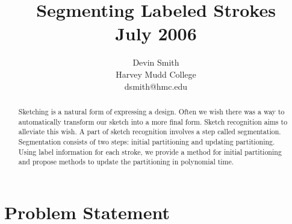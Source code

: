 \documentclass[10pt]{acmsiggraph}               %
\title{Segmenting Labeled Strokes\\
\small{July 2006}}
\author{Devin Smith\\Harvey Mudd College\\dsmith@hmc.edu}%
\begin{document}


\maketitle

\begin{abstract}
Sketching is a natural form of expressing a design.
Often we wish there was a way to automatically transform our sketch into a more final form.
Sketch recognition aims to alleviate this wish.
A part of sketch recognition involves a step called segmentation.
Segmentation consists of two steps: initial partitioning and updating partitioning.
Using label information for each stroke, we provide a method for initial partitioning and propose methods to update the partitioning in polynomial time.
\end{abstract}

\section{Problem Statement}



\end{document}
